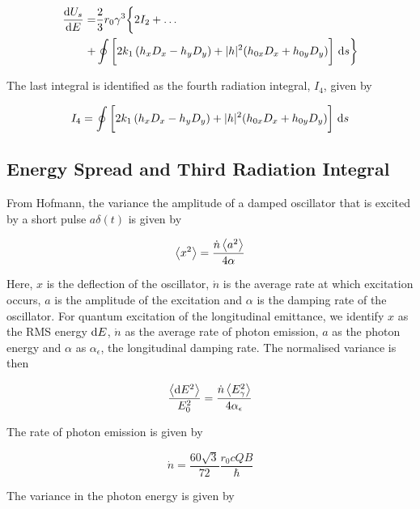 \begin{align}
    \frac{\text{d} {U_s}}{\text{d} {E}} = &\frac{2}{3} r_0 \gamma^3 \bigg\{ 2I_2 + \dots\\
    + & \oint \bigg[2k_1 \left( h_x D_x - h_y D_y \right) + |h|^2 (h_{0x}D_x + h_{0y} D_y)\bigg] \ \text{d} s \bigg\}
\end{align}

The last integral is identified as the fourth radiation integral, $I_4$, given by

\begin{equation}
    I_4 = \oint \bigg[2k_1 \left( h_x D_x - h_y D_y \right) + |h|^2 (h_{0x}D_x + h_{0y} D_y)\bigg] \ \text{d} s
\end{equation}



\subsection{Energy Spread and Third Radiation Integral}
\label{sec:enespreadandi3}

From Hofmann, the variance the amplitude of a damped oscillator that is excited by a short pulse $a\delta(t)$ is given by\cite{hofmann2009}

\begin{equation}
    \left\langle {x^2} \right\rangle = \frac{\dot{n} \left\langle {a^2} \right\rangle}{4\alpha}
\end{equation}

Here, $x$ is the deflection of the oscillator, $\dot{n}$ is the average rate at which excitation occurs, $a$ is the amplitude of the excitation and $\alpha$ is the damping rate of the oscillator. For quantum excitation of the longitudinal emittance, we identify $x$ as the RMS energy $\text{d} E$, $\dot{n}$ as the average rate of photon emission, $a$ as the photon energy and $\alpha$ as $\alpha_\epsilon$, the longitudinal damping rate. The normalised variance is then

\begin{equation}
    \frac{\left\langle {\text{d}E^2} \right\rangle}{E_0^2} = \frac{\dot{n} \left\langle {E_\gamma^2} \right\rangle}{4 \alpha_\epsilon}
    \label{eq:notreallycampbell}
\end{equation}

The rate of photon emission is given by

\begin{equation}
    \dot{n} = \frac{60 \sqrt{3}}{72} \frac{r_0 c Q B}{\hbar}
\end{equation}

The variance in the photon energy is given by

